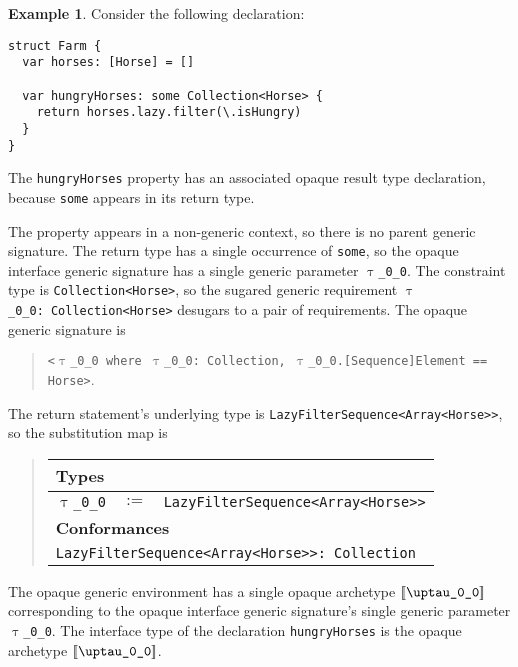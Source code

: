 \documentclass[a4paper,headsepline,bibliography=totoc,toc=flat,fleqn,twoside=semi]{scrbook}
\theoremstyle{definition}
\theoremstyle{definition}
\newtheorem{example}{Example}[chapter]
\theoremstyle{definition}
\newcommand{\ttgp}[2]{\texttt{$\uptau$\_#1\_#2}}
\newcommand{\SubMapC}[2]{\begin{tabular}{|lll|}
\hline
\multicolumn{3}{|l|}{\textbf{Types}}\\
\hline
#1\\
\hline
\hline
\multicolumn{3}{|l|}{\textbf{Conformances}}\\
\hline
#2\\
\hline
\end{tabular}}
\newcommand{\SubType}[2]{\texttt{#1}&$:=$&\texttt{#2}}
\newcommand{\SubConf}[1]{\multicolumn{3}{|l|}{\texttt{#1}}}
\newcommand{\archetype}[1]{$[\![\texttt{#1}]\!]$}
\begin{document}
\begin{example}
Consider the following declaration:
\begin{Verbatim}
struct Farm {
  var horses: [Horse] = []

  var hungryHorses: some Collection<Horse> {
    return horses.lazy.filter(\.isHungry)
  }
}
\end{Verbatim}
The \texttt{hungryHorses} property has an associated opaque result type declaration, because \texttt{some} appears in its return type.

The property appears in a non-generic context, so there is no parent generic signature. The return type has a single occurrence of \texttt{some}, so the opaque interface generic signature has a single generic parameter \texttt{\ttgp{0}{0}}. The constraint type is \texttt{Collection<Horse>}, so the sugared generic requirement \texttt{\ttgp{0}{0}:\ Collection<Horse>} desugars to a pair of requirements. The opaque generic signature is
\begin{quote}
\texttt{<\ttgp{0}{0} where \ttgp{0}{0}:\ Collection, \ttgp{0}{0}.[Sequence]Element == Horse>}.
\end{quote}

The return statement's underlying type is \texttt{LazyFilterSequence<Array<Horse>>}, so the substitution map is
\begin{quote}
\SubMapC{
\SubType{\ttgp{0}{0}}{LazyFilterSequence<Array<Horse>>}
}{
\SubConf{LazyFilterSequence<Array<Horse>>:\ Collection}
}
\end{quote}
The opaque generic environment has a single opaque archetype \archetype{\ttgp{0}{0}} corresponding to the opaque interface generic signature's single generic parameter \ttgp{0}{0}. The interface type of the declaration \texttt{hungryHorses} is the opaque archetype \archetype{\ttgp{0}{0}}.
\end{example}
\end{document}
